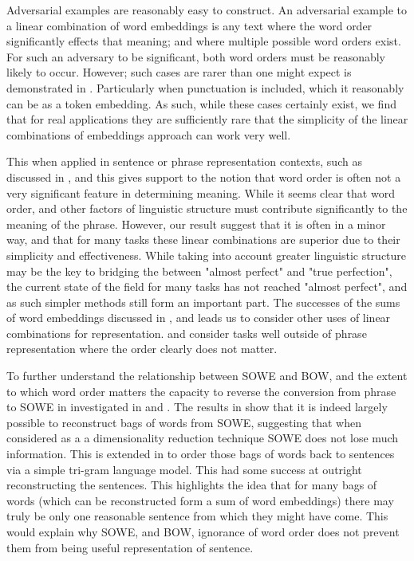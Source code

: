 \documentclass{book}
\begin{document}
Adversarial examples are reasonably easy to construct.
An adversarial example to a linear combination of word embeddings is any text where the word order significantly effects that meaning;
and where multiple possible word orders exist.
For such an adversary to be significant, both word orders must be reasonably likely to occur.
However; such cases are rarer than one might expect is demonstrated in .
Particularly when punctuation is included, which it reasonably can be as a token embedding.
As such, while these cases certainly exist, we find that for real applications
they are sufficiently rare that the simplicity of the linear combinations of embeddings approach can work very well.


This when applied in sentence or phrase representation contexts,
such as discussed in , and 
this gives support to the notion that word order is often not a very significant feature in determining meaning.
While it seems clear that word order, and other factors of linguistic structure must contribute significantly to the meaning of the phrase.
However, our result suggest that it is often in a minor way, and that for many tasks these linear combinations are superior due to their simplicity and effectiveness.
While taking into account greater linguistic structure may be the key to bridging the between "almost perfect" and "true perfection", the current state of the field for many tasks has not reached "almost perfect", and as such simpler methods still form an important part.
The successes of the sums of word embeddings discussed in , and  leads us to consider other uses of linear combinations for representation.
 and  consider tasks well outside of phrase representation where the order clearly does not matter.

To further understand the relationship between SOWE and BOW, and the extent to which word order matters the capacity to reverse the conversion from phrase to SOWE in investigated in  and .
The results in  show that it is indeed largely possible to reconstruct bags of words from SOWE, suggesting that when considered as a a dimensionality reduction technique SOWE does not lose much information.
This is extended in  to order those bags of words back to sentences via a simple tri-gram language model.
This had some success at outright reconstructing the sentences.
This highlights the idea that for many  bags of words (which can be reconstructed form a sum of word embeddings) there may truly be only one reasonable sentence from which they might have come.
This would explain why SOWE, and BOW, ignorance of word order does not prevent them from being useful representation of sentence.
\end{document}
